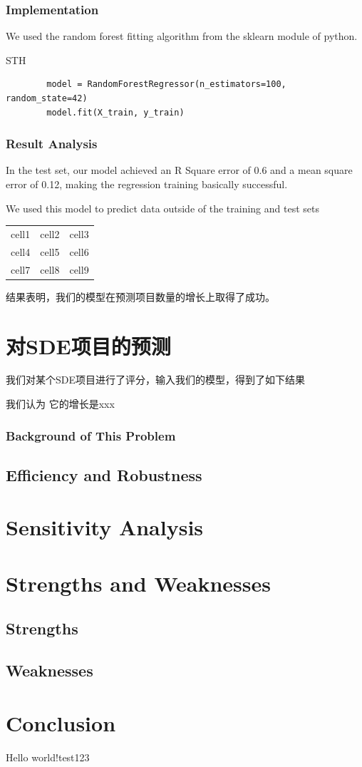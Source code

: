 \documentclass[a4paper]{article}
\begin{document}
\subsubsection{Implementation}
We used the random forest fitting algorithm from the sklearn module of python.
\begin{listing}[htb]\caption{STH}\label{code:processdweet}
    \begin{verbatim}
        model = RandomForestRegressor(n_estimators=100, random_state=42)
        model.fit(X_train, y_train)
\end{verbatim} 
\end{listing}


\subsubsection{Result Analysis}
In the test set, our model achieved an R Square error of 0.6 and a mean square error of 0.12, making the regression training basically successful.

We used this model to predict data outside of the training and test sets

\begin{center}
    \begin{tabular}{ c c c }
     cell1 & cell2 & cell3 \\ 
     cell4 & cell5 & cell6 \\  
     cell7 & cell8 & cell9    
    \end{tabular}
    \end{center}

结果表明，我们的模型在预测项目数量的增长上取得了成功。



\section{对SDE项目的预测}
我们对某个SDE项目进行了评分，输入我们的模型，得到了如下结果

我们认为 它的增长是xxx
\subsubsection{Background of This Problem}
\subsection{Efficiency and Robustness}
\section{Sensitivity Analysis}
\section{Strengths and Weaknesses}
\subsection{Strengths}
\subsection{Weaknesses}
\section{Conclusion}
Hello world!test123
\end{document}
